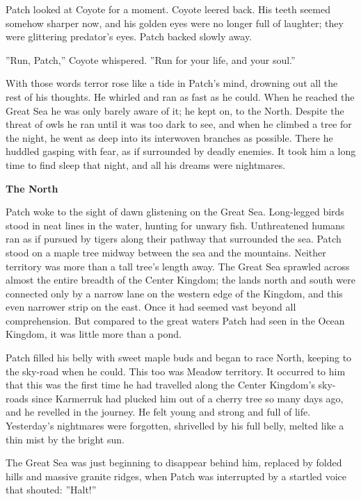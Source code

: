 \documentclass[11pt]{article}
\begin{document}
 Patch looked at Coyote for a moment. Coyote leered back. His teeth seemed somehow sharper now, and his golden eyes were no longer full of laughter; they were glittering predator's eyes. Patch backed slowly away.\par
 ''Run, Patch,'' Coyote whispered. ''Run for your life, and your soul.''\par
 With those words terror rose like a tide in Patch's mind, drowning out all the rest of his thoughts. He whirled and ran as fast as he could. When he reached the Great Sea he was only barely aware of it; he kept on, to the North. Despite the threat of owls he ran until it was too dark to see, and when he climbed a tree for the night, he went as deep into its interwoven branches as possible. There he huddled gasping with fear, as if surrounded by deadly enemies. It took him a long time to find sleep that night, and all his dreams were nightmares.\par
\par
{\bf The North\par
}\par
 Patch woke to the sight of dawn glistening on the Great Sea. Long-legged birds stood in neat lines in the water, hunting for unwary fish. Unthreatened humans ran as if pursued by tigers along their pathway that surrounded the sea. Patch stood on a maple tree midway between the sea and the mountains. Neither territory was more than a tall tree's length away. The Great Sea sprawled across almost the entire breadth of the Center Kingdom; the lands north and south were connected only by a narrow lane on the western edge of the Kingdom, and this even narrower strip on the east. Once it had seemed vast beyond all comprehension. But compared to the great waters Patch had seen in the Ocean Kingdom, it was little more than a pond.\par
 Patch filled his belly with sweet maple buds and began to race North, keeping to the sky-road when he could. This too was Meadow territory. It occurred to him that this was the first time he had travelled along the Center Kingdom's sky-roads since Karmerruk had plucked him out of a cherry tree so many days ago, and he revelled in the journey. He felt young and strong and full of life. Yesterday's nightmares were forgotten, shrivelled by his full belly, melted like a thin mist by the bright sun.\par
 The Great Sea was just beginning to disappear behind him, replaced by folded hills and massive granite ridges, when Patch was interrupted by a startled voice that shouted: ''Halt!''\par
\end{document}
